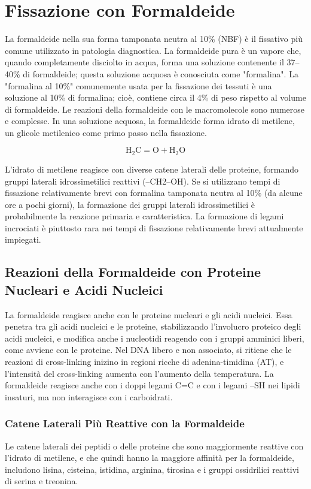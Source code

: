 \section{Fissazione con Formaldeide}
La formaldeide nella sua forma tamponata neutra al 10\% (NBF) è il fissativo più comune utilizzato in patologia diagnostica. La formaldeide pura è un vapore che, quando completamente disciolto in acqua, forma una soluzione contenente il 37–40\% di formaldeide; questa soluzione acquosa è conosciuta come "formalina". La "formalina al 10\%" comunemente usata per la fissazione dei tessuti è una soluzione al 10\% di formalina; cioè, contiene circa il 4\% di peso rispetto al volume di formaldeide. Le reazioni della formaldeide con le macromolecole sono numerose e complesse.  In una soluzione acquosa, la formaldeide forma idrato di metilene, un glicole metilenico come primo passo nella fissazione.

\[
\text{H}_2\text{C} = \text{O} + \text{H}_2\text{O}
\]

L'idrato di metilene reagisce con diverse catene laterali delle proteine, formando gruppi laterali idrossimetilici reattivi (–CH2–OH). Se si utilizzano tempi di fissazione relativamente brevi con formalina tamponata neutra al 10\% (da alcune ore a pochi giorni), la formazione dei gruppi laterali idrossimetilici è probabilmente la reazione primaria e caratteristica. La formazione di legami incrociati è piuttosto rara nei tempi di fissazione relativamente brevi attualmente impiegati.

\subsection{Reazioni della Formaldeide con Proteine Nucleari e Acidi Nucleici}
La formaldeide reagisce anche con le proteine nucleari e gli acidi nucleici. Essa penetra tra gli acidi nucleici e le proteine, stabilizzando l'involucro proteico degli acidi nucleici, e modifica anche i nucleotidi reagendo con i gruppi amminici liberi, come avviene con le proteine. Nel DNA libero e non associato, si ritiene che le reazioni di cross-linking inizino in regioni ricche di adenina-timidina (AT), e l'intensità del cross-linking aumenta con l'aumento della temperatura. La formaldeide reagisce anche con i doppi legami C=C e con i legami –SH nei lipidi insaturi, ma non interagisce con i carboidrati.

\subsubsection{Catene Laterali Più Reattive con la Formaldeide}
Le catene laterali dei peptidi o delle proteine che sono maggiormente reattive con l'idrato di metilene, e che quindi hanno la maggiore affinità per la formaldeide, includono lisina, cisteina, istidina, arginina, tirosina e i gruppi ossidrilici reattivi di serina e treonina.


